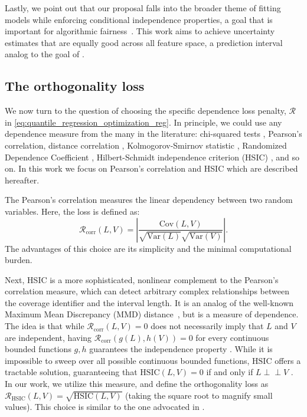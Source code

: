 \documentclass{article}
\newcommand{\indep}{\perp \!\!\! \perp}
\begin{document}
Lastly, we point out that our proposal falls into the broader theme of fitting models while enforcing conditional independence properties, a goal that is important for algorithmic fairness~\citep[e.g.,][]{fairness_constraints, ERM_fairness, romano2020achieving}. This work aims to achieve uncertainty estimates that are equally good across all feature space, a prediction interval analog to the goal of \cite{hsic_implementation}.

\subsection{The orthogonality loss}
\label{penalty_formulation}
We now turn to the question of choosing the specific dependence loss penalty, $\mathcal{R}$ in \eqref{eq:quantile_regression_optimization_reg}.
In principle, we could use any dependence measure from the many in the literature: chi-squared tests \cite{chi2_test}, Pearson's correlation, distance correlation \cite{distance_corr}, Kolmogorov-Smirnov statistic \cite{KS_test}, Randomized Dependence Coefficient \cite{RDC}, Hilbert-Schmidt independence criterion (HSIC) \cite{hsic}, and so on. In this work we focus on Pearson's correlation and HSIC which are described hereafter.

The Pearson's correlation measures the linear dependency between two random variables. Here, the loss is defined as:
\begin{equation}
\label{eq:corr}
\mathcal{R}_{\textrm{corr}}(L, V)= \left| \frac{\textrm{Cov}(L, V)}{\sqrt{\textrm{Var}(L)} \sqrt{\textrm{Var}(V)}} \right|.
\end{equation} 
The advantages of this choice are its simplicity and the minimal computational burden.

Next, HSIC is a more sophisticated, nonlinear complement to the Pearson's correlation measure, which can detect arbitrary complex relationships between the coverage identifier and the interval length. It is an analog of the well-known Maximum Mean Discrepancy (MMD) distance~\cite{MMD}, but is a measure of dependence.  The idea is that while $\mathcal{R}_{\textrm{corr}}(L,V)=0$ does not necessarily imply that $L $ and $V$ are independent, having $\mathcal{R}_{\textrm{corr}}(g(L),h(V))=0$ for every continuous bounded functions $g, h$ guarantees the independence property \cite{corr_indp_property}. While it is impossible to sweep over all possible continuous bounded functions, $\textrm{HSIC}$ offers a tractable solution, guaranteeing that $\textrm{HSIC}(L, V)=0$ if and only if $L \indep V$ \cite{hsic}. In our work, we utilize this measure, and define the orthogonality loss as $\mathcal{R}_{\textrm{HSIC}}(L,V) = \sqrt{\textrm{HSIC}(L, V)}$ (taking the square root to magnify small values). This choice is similar to the one advocated in \cite{mmd_sqrt}. 
\end{document}
